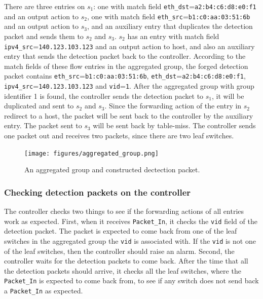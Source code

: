 \documentclass[conference]{IEEEtran}
\begin{document}
There are three entries on $s_1$: one with match field \texttt{eth\_dst}=\texttt{a2:b4:c6:d8:e0:f1} and an output action to $s_2$, one with match field \texttt{eth\_src}=\texttt{b1:c0:aa:03:51:6b} and an output action to $s_3$, and an auxiliary entry that duplicates the detection packet and sends them to $s_2$ and $s_3$. $s_2$ has an entry with match field \texttt{ipv4\_src}=\texttt{140.123.103.123} and an output action to host, and also an auxiliary entry that sends the detection packet back to the controller. According to the match fields of these flow entries in the aggregated group, the forged detection packet contains \texttt{eth\_src}=\texttt{b1:c0:aa:03:51:6b}, \texttt{eth\_dst}=\texttt{a2:b4:c6:d8:e0:f1}, \texttt{ipv4\_src}=\texttt{140.123.103.123} and \texttt{vid}=\texttt{1}. After the aggregated group with group identifier 1 is found, the controller sends the detection packet to $s_1$, it will be duplicated and sent to $s_2$ and $s_3$. Since the forwarding action of the entry in $s_2$ redirect to a host, the packet will be sent back to the controller by the auxiliary entry. The packet sent to $s_3$ will be sent back by table-miss. The controller sends one packet out and receives two packets, since there are two leaf switches.

\begin{figure}[ht]
\begin{center}
\texttt{[image: figures/aggregated\_group.png]}
\end{center}
\caption{An aggregated group and constructed dectection packet.}
\label{aggregated_group}
\end{figure}

\subsubsection{Checking detection packets on the controller}
The controller checks two things to see if the forwarding actions of all entries work as expected. First, when it receives \texttt{Packet\_In}, it checks the \texttt{vid} field of the detection packet. The packet is expected to come back from one of the leaf switches in the aggregated group the \texttt{vid} is associated with. If the \texttt{vid} is not one of the leaf switches, then the controller should raise an alarm. Second, the controller waits for the detection packets to come back. After the time that all the detection packets should arrive, it checks all the leaf switches, where the \texttt{Packet\_In} is expected to come back from, to see if any switch does not send back a \texttt{Packet\_In} as expected. 
\end{document}
